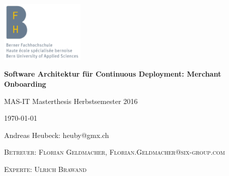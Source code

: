 \graphicspath{{./images/}}

\begin{titlepage}
	\raggedright
	\includegraphics[width=0.3\textwidth]{bfhlogonew.png}\par\vspace{1cm}
	\vspace{2cm}
	{\huge\bfseries Software Architektur für Continuous Deployment: Merchant Onboarding\par}
	\vspace{2cm}
	{\large MAS-IT Masterthesis Herbstsemester 2016\par}
	\vspace{0.5cm}
	{\large \today\par}
	\vspace{0.5cm}
	{\large Andreas Heubeck: heuby@gmx.ch\par}
	\vfill
	\vspace{3cm}
	
	\textsc{Betreuer: Florian Geldmacher, Florian.Geldmacher@six-group.com}\par
	\textsc{Experte: Ulrich Brawand}

	\vfill

\end{titlepage}